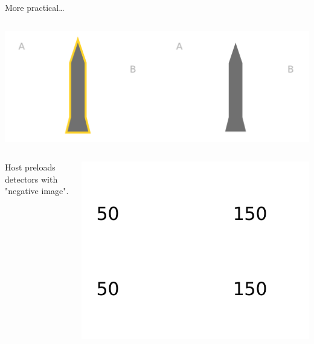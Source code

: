 \documentclass[presentation]{beamer}
\begin{document}
\begin{frame}[label=sec-5-5]{More practical\ldots{}}
\begin{columns}
\begin{column}{0.48\textwidth}

\includegraphics[width=\textwidth]{images/zkp/measurement_step1.pdf}
\vspace{1cm}

\pause

\begin{columns}
\begin{column}{0.48\textwidth}
\footnotesize Host preloads detectors with "negative image". \normalsize
\end{column}

\begin{column}{0.48\textwidth}

\includegraphics[width=\textwidth]{images/zkp/measurement_detectors_host.pdf}

\pause
\end{column}
\end{columns}
\end{column}


\end{columns}
\end{frame}
\end{document}

